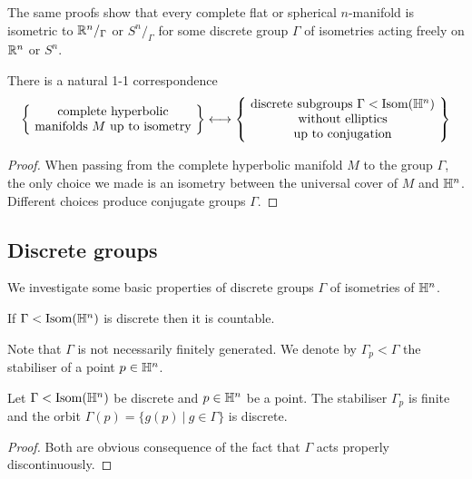 \begin{oss}
The same proofs show that every complete flat or spherical $n$-manifold is isometric to $\mathbb{R}^n/_\Gamma$ or $S^n/_\Gamma$ for some discrete group $\Gamma$ of isometries acting freely on $\mathbb{R}^n$ or $S^n$. 
\end{oss}

\begin{cor} There is a natural 1-1 correspondence
$$\left\{\!
\begin{array}{c}{\rm complete\ hyperbolic} \\ {\rm manifolds\ } M {\rm\ up\ to\ isometry}\end{array}\!\right\} \longleftrightarrow
\left\{\!
\begin{array}{c}{\rm discrete\ subgroups\ } \Gamma < \Iso(\matH^n) \\ {\rm without\ elliptics} \\ {\rm up\ to\ conjugation}\end{array}\!\right\}$$
\end{cor}
\begin{proof}
When passing from the complete hyperbolic manifold $M$ to the group $\Gamma$, the only choice we made is an isometry between the universal cover of $M$ and $\mathbb{H}^n$. Different choices produce conjugate groups $\Gamma$.
\end{proof}

\subsection{Discrete groups}
We investigate some basic properties of discrete groups $\Gamma$ of isometries of $\mathbb{H}^n$.

\begin{ex} If $\Gamma<{\rm Isom}(\mathbb{H}^n)$ is discrete then it is countable.
\end{ex}

Note that $\Gamma$ is not necessarily finitely generated. We denote by $\Gamma_p < \Gamma$ the stabiliser of a point $p\in \mathbb{H}^n$.

\begin{prop} \label{discrete:prop}
Let $\Gamma <{\rm Isom}(\mathbb{H}^n)$ be discrete and $p\in\mathbb{H}^n$ be a point. The stabiliser $\Gamma_p$ is finite and the orbit $\Gamma(p) = \{g(p)\ |\ g\in \Gamma\}$ is discrete.
\end{prop}
\begin{proof}
Both are obvious consequence of the fact that $\Gamma$
acts properly discontinuously.
\end{proof}


